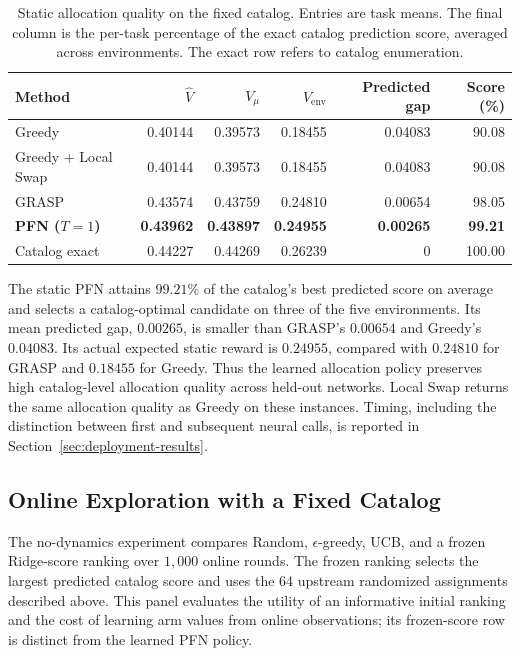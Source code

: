 \documentclass[a4paper,11pt]{article}
\numberwithin{equation}{section}
\begin{document}
\begin{table}[htbp]
\centering\small
\caption{Static allocation quality on the fixed catalog. Entries are task means. The final column is the per-task percentage of the exact catalog prediction score, averaged across environments. The exact row refers to catalog enumeration.}
\label{tab:static-results}
\begin{tabular*}{\textwidth}{@{\extracolsep{\fill}}lrrrrr@{}}
\toprule Method & $\widehat V$ & $V_\mu$ & $V_{\mathrm{env}}$ & Predicted gap & Score (\%)\\\midrule
Greedy & 0.40144 & 0.39573 & 0.18455 & 0.04083 & 90.08\\
Greedy + Local Swap & 0.40144 & 0.39573 & 0.18455 & 0.04083 & 90.08\\
GRASP & 0.43574 & 0.43759 & 0.24810 & 0.00654 & 98.05\\
\textbf{PFN ($T=1$)} & \textbf{0.43962} & \textbf{0.43897} & \textbf{0.24955} & \textbf{0.00265} & \textbf{99.21}\\
Catalog exact & 0.44227 & 0.44269 & 0.26239 & 0 & 100.00\\
\bottomrule
\end{tabular*}
\end{table}

The static PFN attains $99.21\%$ of the catalog's best predicted score on average and selects a catalog-optimal candidate on three of the five environments. Its mean predicted gap, $0.00265$, is smaller than GRASP's $0.00654$ and Greedy's $0.04083$. Its actual expected static reward is $0.24955$, compared with $0.24810$ for GRASP and $0.18455$ for Greedy. Thus the learned allocation policy preserves high catalog-level allocation quality across held-out networks. Local Swap returns the same allocation quality as Greedy on these instances. Timing, including the distinction between first and subsequent neural calls, is reported in Section~\ref{sec:deployment-results}.

\subsection{Online Exploration with a Fixed Catalog}
\label{sec:bandit-results}
The no-dynamics experiment compares Random, $\epsilon$-greedy, UCB, and a frozen Ridge-score ranking over $1{,}000$ online rounds. The frozen ranking selects the largest predicted catalog score and uses the $64$ upstream randomized assignments described above. This panel evaluates the utility of an informative initial ranking and the cost of learning arm values from online observations; its frozen-score row is distinct from the learned PFN policy.
\end{document}

